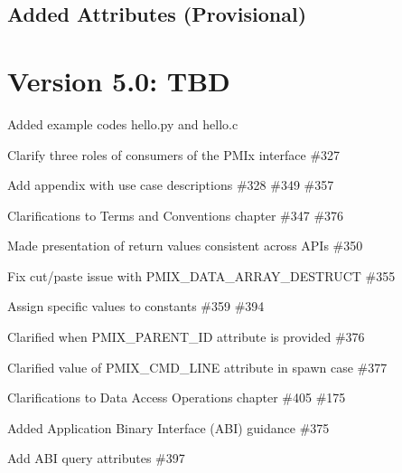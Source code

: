 \subsection{Added Attributes (Provisional)}





\section{Version 5.0: TBD}

\begin{compactitemize}
  \item Added example codes hello.py and hello.c
  \item Clarify three roles of consumers of the PMIx interface \#327
  \item Add appendix with use case descriptions \#328 \#349 \#357
  \item Clarifications to Terms and Conventions chapter \#347 \#376
  \item Made presentation of return values consistent across APIs \#350
  \item Fix cut/paste issue with PMIX_DATA_ARRAY_DESTRUCT \#355
  \item Assign specific values to constants \#359 \#394
  \item Clarified when PMIX_PARENT_ID attribute is provided \#376
  \item Clarified value of PMIX_CMD_LINE attribute in spawn case \#377
  \item Clarifications to Data Access Operations chapter \#405 \#175
  \item Added Application Binary Interface (ABI) guidance \#375
  \item Add ABI query attributes \#397
\end{compactitemize}

